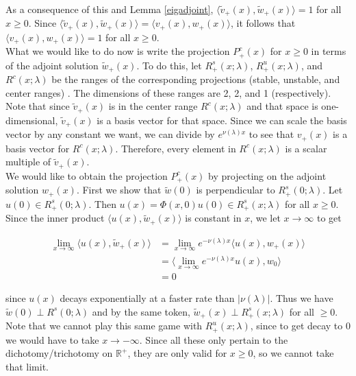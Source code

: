 \documentclass[12pt]{article}
\def\R{{\mathbb R}}
\begin{document}
As a consequence of this and Lemma \ref{eigadjoint}, $\langle \tilde{v}_+(x), \tilde{w}_+(x) \rangle = 1$ for all $x \geq 0$. Since $\langle \tilde{v}_+(x), \tilde{w}_+(x) \rangle = \langle v_+(x), w_+(x) \rangle$, it follows that $\langle v_+(x), w_+(x) \rangle = 1$ for all $x \geq 0$.\\

What we would like to do now is write the projection $P^c_+(x)$ for $x \geq 0$ in terms of the adjoint solution $\tilde{w}_+(x)$. To do this, let $R^s_+(x; \lambda)$, $R^u_+(x; \lambda)$, and $R^c(x; \lambda)$ be the ranges of the corresponding projections (stable, unstable, and center ranges)
. The dimensions of these ranges are 2, 2, and 1 (respectively). Note that since $\tilde{v}_+(x)$ is in the center range $R^c(x; \lambda)$ and that space is one-dimensional, $\tilde{v}_+(x)$ is a basis vector for that space. Since we can scale the basis vector by any constant we want, we can divide by $e^{\nu(\lambda) x }$ to see that $v_+(x)$ is a basis vector for $R^c(x; \lambda)$. Therefore, every element in $R^c(x; \lambda)$ is a scalar multiple of $\tilde{v}_+(x)$. \\

We would like to obtain the projection $P^c_+(x)$ by projecting on the adjoint solution $w_+(x)$. First we show that $\tilde{w}(0)$ is perpendicular to $R^s_+(0; \lambda)$. Let $u(0) \in R^s_+(0; \lambda)$. Then $u(x) = \Phi(x, 0)u(0) \in R^s_+(x; \lambda)$ for all $x \geq 0$. Since the inner product $\langle u(x), \tilde{w}_+(x) \rangle$ is constant in $x$, we let $x \rightarrow \infty$ to get

\begin{align*}
\lim_{x \rightarrow \infty} \langle u(x), \tilde{w}_+(x) \rangle &= \lim_{x \rightarrow \infty} e^{-\nu(\lambda) x} \langle u(x), w_+(x) \rangle \\
&= \langle \lim_{x \rightarrow \infty} e^{-\nu(\lambda) x} u(x), w_0 \rangle \\
&= 0
\end{align*}

since $u(x)$ decays exponentially at a faster rate than $|\nu(\lambda)|$. Thus we have $\tilde{w}(0) \perp R^s(0; \lambda)$ and by the same token, $\tilde{w}_+(x) \perp R^s_+(x; \lambda)$ for all $ \geq 0$.\\

Note that we cannot play this same game with $R^u_+(x; \lambda)$, since to get decay to 0 we would have to take $x \rightarrow -\infty$. Since all these only pertain to the dichotomy/trichotomy on $\R^+$, they are only valid for $x \geq 0$, so we cannot take that limit.\\
\end{document}
